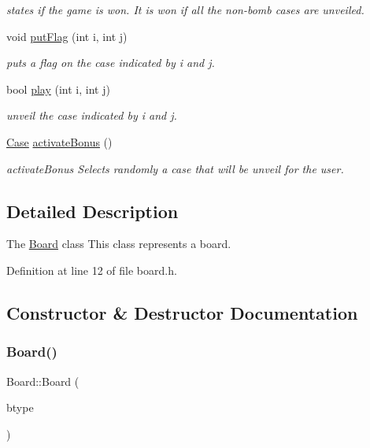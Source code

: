 \begin{DoxyCompactItemize}
\begin{DoxyCompactList}\small\item\em states if the game is won. It is won if all the non-\/bomb cases are unveiled. \end{DoxyCompactList}\item 
void \hyperlink{class_board_a1d4e828a0cc3b85ba3f86534e76e2f84}{put\+Flag} (int i, int j)
\begin{DoxyCompactList}\small\item\em puts a flag on the case indicated by i and j. \end{DoxyCompactList}\item 
bool \hyperlink{class_board_a47700b8c7c08c2843e200594e620f2fa}{play} (int i, int j)
\begin{DoxyCompactList}\small\item\em unveil the case indicated by i and j. \end{DoxyCompactList}\item 
\hyperlink{class_case}{Case} \hyperlink{class_board_a66b4889df2323241f10aca4b1d38bdf5}{activate\+Bonus} ()
\begin{DoxyCompactList}\small\item\em activate\+Bonus Selects randomly a case that will be unveil for the user. \end{DoxyCompactList}\end{DoxyCompactItemize}


\subsection{Detailed Description}
The \hyperlink{class_board}{Board} class This class represents a board. 

Definition at line 12 of file board.\+h.



\subsection{Constructor \& Destructor Documentation}
\mbox{\label{class_board_ad42b2461203bc38788e8f3488a6a7636}} 
\subsubsection{\texorpdfstring{Board()}{Board()}}
{\footnotesize\ttfamily Board\+::\+Board (\begin{DoxyParamCaption}\item[{const \hyperlink{struct_board_type}{Board\+Type} \&}]{btype }\end{DoxyParamCaption})}




